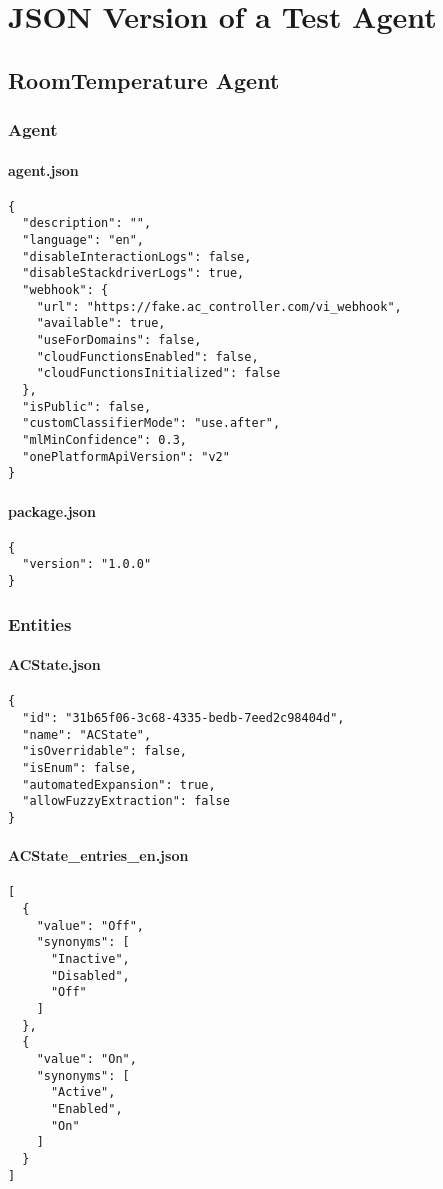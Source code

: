 \chapter{JSON Version of a Test Agent}
\section{RoomTemperature Agent}
\label{RoomTemperature Agent JSON}
\subsection{Agent}
\subsubsection{agent.json}
\begin{lstlisting}
{
  "description": "",
  "language": "en",
  "disableInteractionLogs": false,
  "disableStackdriverLogs": true,
  "webhook": {
    "url": "https://fake.ac_controller.com/vi_webhook",
    "available": true,
    "useForDomains": false,
    "cloudFunctionsEnabled": false,
    "cloudFunctionsInitialized": false
  },
  "isPublic": false,
  "customClassifierMode": "use.after",
  "mlMinConfidence": 0.3,
  "onePlatformApiVersion": "v2"
}
\end{lstlisting}
\subsubsection{package.json}
\begin{lstlisting}
{
  "version": "1.0.0"
}
\end{lstlisting}
\subsection{Entities}
\subsubsection{ACState.json}
\begin{lstlisting}
{
  "id": "31b65f06-3c68-4335-bedb-7eed2c98404d",
  "name": "ACState",
  "isOverridable": false,
  "isEnum": false,
  "automatedExpansion": true,
  "allowFuzzyExtraction": false
}	
\end{lstlisting}
\subsubsection{ACState\_entries\_en.json}
\begin{lstlisting}
[
  {
    "value": "Off",
    "synonyms": [
      "Inactive",
      "Disabled",
      "Off"
    ]
  },
  {
    "value": "On",
    "synonyms": [
      "Active",
      "Enabled",
      "On"
    ]
  }
]
\end{lstlisting}

